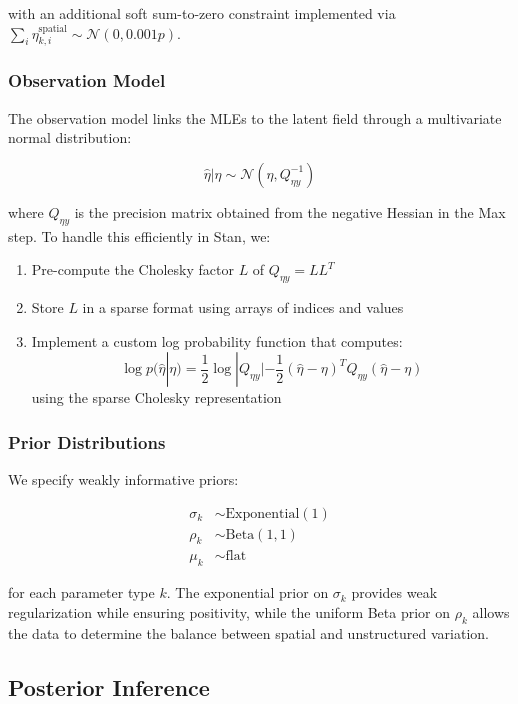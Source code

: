 \documentclass[
  letterpaper,
  DIV=11,
  numbers=noendperiod]{scrartcl}
\providecommand{\tightlist}{%
  \setlength{\itemsep}{0pt}\setlength{\parskip}{0pt}}\usepackage{longtable,booktabs,array}
\begin{document}
with an additional soft sum-to-zero constraint implemented via
\(\sum_i \eta^{\text{spatial}}_{k,i} \sim \mathcal{N}(0, 0.001p)\).

\subsubsection{Observation Model}\label{observation-model}

The observation model links the MLEs to the latent field through a
multivariate normal distribution:

\[\hat{\eta} | \eta \sim \mathcal{N}(\eta, Q^{-1}_{\eta y})\]

where \(Q_{\eta y}\) is the precision matrix obtained from the negative
Hessian in the Max step. To handle this efficiently in Stan, we:

\begin{enumerate}
\def\labelenumi{\arabic{enumi}.}
\tightlist
\item
  Pre-compute the Cholesky factor \(L\) of \(Q_{\eta y} = LL^T\)
\item
  Store \(L\) in a sparse format using arrays of indices and values
\item
  Implement a custom log probability function that computes:
  \[\log p(\hat{\eta}|\eta) = \frac{1}{2}\log|Q_{\eta y}| - \frac{1}{2}(\hat{\eta} - \eta)^T Q_{\eta y}(\hat{\eta} - \eta)\]
  using the sparse Cholesky representation
\end{enumerate}

\subsubsection{Prior Distributions}\label{prior-distributions}

We specify weakly informative priors:

\[
\begin{aligned}
\sigma_k &\sim \text{Exponential}(1) \\
\rho_k &\sim \text{Beta}(1,1) \\
\mu_k &\sim \text{flat}
\end{aligned}
\]

for each parameter type \(k\). The exponential prior on \(\sigma_k\)
provides weak regularization while ensuring positivity, while the
uniform Beta prior on \(\rho_k\) allows the data to determine the
balance between spatial and unstructured variation.

\subsection{Posterior Inference}\label{posterior-inference}
\end{document}
